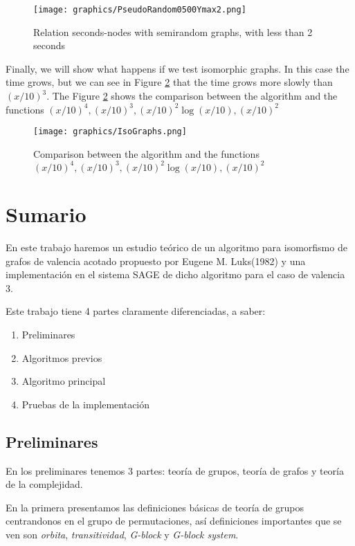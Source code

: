 \documentclass[12pt,a4paper]{book}
\theoremstyle{plain}
\theoremstyle{definition}
\theoremstyle{remark}
\begin{document}
\begin{figure}
\centering
\texttt{[image: graphics/PseudoRandom0500Ymax2.png]}
\caption{Relation seconds-nodes with semirandom graphs, with less than 2 seconds}\label{Graphic3}
\end{figure}

Finally, we will  show what happens if we test isomorphic graphs. In this case the time grows, but we can see in Figure \ref{Graphic4} 
that the time grows more slowly than $(x/10)^3$. The Figure \ref{Graphic4} shows the comparison between the algorithm and the 
functions $(x/10)^4, (x/10)^3, (x/10)^2 \log (x/10), (x/10)^2$

\begin{figure}
\centering
\texttt{[image: graphics/IsoGraphs.png]}
\caption{Comparison between the algorithm and the functions $(x/10)^4, (x/10)^3, (x/10)^2 \log (x/10), (x/10)^2$ }\label{Graphic4}
\end{figure}

\appendix




\chapter*{Sumario}

En este trabajo haremos un estudio teórico de un algoritmo para isomorfismo de grafos de valencia acotado propuesto por Eugene 
M. Luks(1982) y una implementación en el sistema SAGE de dicho algoritmo para el caso de valencia 3. 

Este trabajo tiene 4 partes claramente diferenciadas, a saber:
\begin{enumerate}
 \item Preliminares
 \item Algoritmos previos
 \item Algoritmo principal
 \item Pruebas de la implementación
\end{enumerate}

\section*{Preliminares}
En los preliminares tenemos 3 partes: teoría de grupos, teoría de grafos y teoría de la complejidad.

En la primera  presentamos las definiciones básicas de teoría de grupos centrandonos en el grupo de permutaciones, así 
definiciones importantes que se ven son \emph{orbita}, \emph{transitividad}, \emph{G-block} y \emph{G-block system}.
\end{document}
